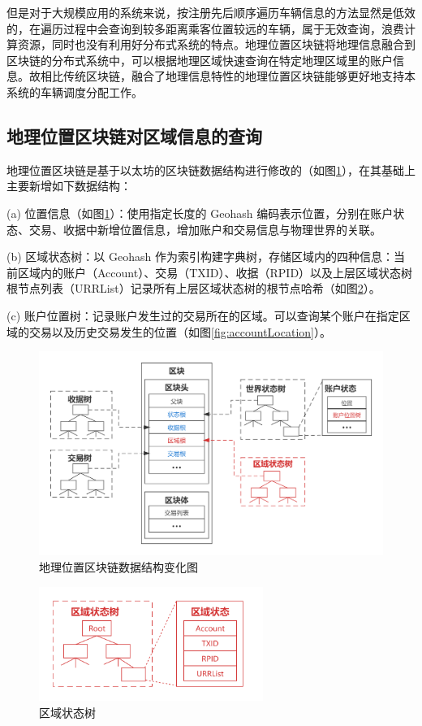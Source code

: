 但是对于大规模应用的系统来说，按注册先后顺序遍历车辆信息的方法显然是低效的，在遍历过程中会查询到较多距离乘客位置较远的车辆，属于无效查询，浪费计算资源，同时也没有利用好分布式系统的特点。地理位置区块链将地理信息融合到区块链的分布式系统中，可以根据地理区域快速查询在特定地理区域里的账户信息。故相比传统区块链，融合了地理信息特性的地理位置区块链能够更好地支持本系统的车辆调度分配工作。

\subsection{地理位置区块链对区域信息的查询}
地理位置区块链是基于以太坊的区块链数据结构进行修改的（如图\ref{fig:treeBlockchain}），在其基础上主要新增如下数据结构：

(a) 位置信息（如图\ref{fig:treeBlockchain}）：使用指定长度的 Geohash 编码表示位置，分别在账户状态、交易、收据中新增位置信息，增加账户和交易信息与物理世界的关联。

(b) 区域状态树：以 Geohash 作为索引构建字典树，存储区域内的四种信息：当前区域内的账户（Account）、交易（TXID）、收据（RPID）以及上层区域状态树根节点列表（URRList）记录所有上层区域状态树的根节点哈希（如图\ref{fig:regionState}）。

(c) 账户位置树：记录账户发生过的交易所在的区域。可以查询某个账户在指定区域的交易以及历史交易发生的位置（如图\ref{fig:accountLocation}）。

\begin{figure}[h]
  \centering
  \includegraphics[width=1.0\textwidth]{figures/地理位置区块链}
  \caption{地理位置区块链数据结构变化图}\label{fig:treeBlockchain}
\end{figure}

\begin{figure}[h]
  \centering
  \includegraphics[width=0.65\textwidth]{figures/区域状态树}
  \caption{区域状态树}\label{fig:regionState}
\end{figure}

